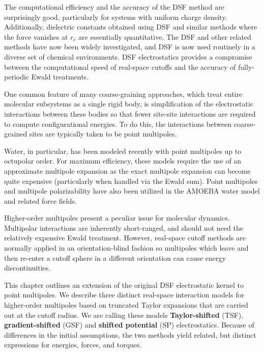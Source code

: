 The computational efficiency and the accuracy of the DSF method are
surprisingly good, particularly for systems with uniform charge
density. Additionally, dielectric constants obtained using DSF and
similar methods where the force vanishes at $r_{c}$ are
essentially quantitative.\cite{Izvekov08} The DSF and other
related methods have now been widely investigated,\cite{Hansen12}
and DSF is now used routinely in a diverse set of chemical
environments.\cite{Shi13,McCann13,kannam13,Forrest12,English08,Louden13,Tokumasu13}
DSF electrostatics provides a compromise between the computational
speed of real-space cutoffs and the accuracy of fully-periodic Ewald
treatments.

One common feature of many coarse-graining approaches, which treat
entire molecular subsystems as a single rigid body, is simplification
of the electrostatic interactions between these bodies so that fewer
site-site interactions are required to compute configurational
energies. To do this, the interactions between coarse-grained sites
are typically taken to be point
multipoles.\cite{Golubkov06,Orsi10,Orsi11}

Water, in particular, has been modeled recently with point multipoles
up to octupolar
order.\cite{Chowdhuri06,Te10rt,Te10ys,Te10vn} For
maximum efficiency, these models require the use of an approximate
multipole expansion as the exact multipole expansion can become quite
expensive (particularly when handled via the Ewald
sum).\cite{Ichiye06} Point multipoles and multipole
polarizability have also been utilized in the AMOEBA water model and
related force fields.\cite{Ponder10,schnieders07,Ren11}

Higher-order multipoles present a peculiar issue for molecular
dynamics. Multipolar interactions are inherently short-ranged, and
should not need the relatively expensive Ewald treatment.  However,
real-space cutoff methods are normally applied in an orientation-blind
fashion so multipoles which leave and then re-enter a cutoff sphere in
a different orientation can cause energy discontinuities.

This chapter outlines an extension of the original DSF electrostatic
kernel to point multipoles.  We describe three distinct real-space
interaction models for higher-order multipoles based on truncated
Taylor expansions that are carried out at the cutoff radius.  We are
calling these models {\bf Taylor-shifted} (TSF), {\bf
  gradient-shifted} (GSF) and {\bf shifted potential} (SP)
electrostatics.  Because of differences in the initial assumptions,
the two methods yield related, but distinct expressions for energies,
forces, and torques.

